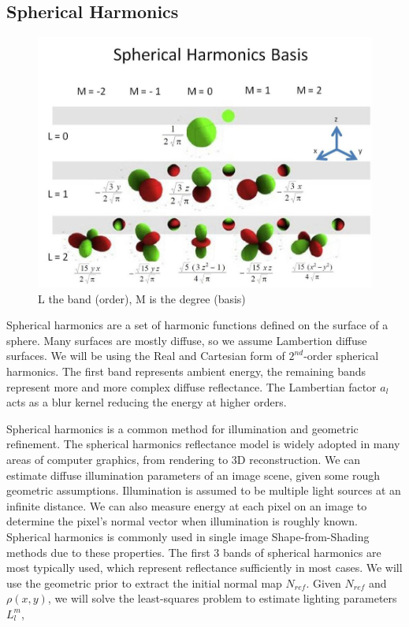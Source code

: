 \documentclass[10pt,twocolumn,letterpaper]{article}
\begin{document}
\subsection{Spherical Harmonics}
\begin{figure}[h]
    \begin{center}
        \includegraphics [scale=0.5] {image/sh_basis.jpg}
    \end{center}
    \caption{L the band (order), M is the degree (basis)}
    \label{fig:sh-basis}
\end{figure} 
Spherical harmonics are a set of harmonic functions defined on the surface of a sphere. Many surfaces are mostly diffuse, so we assume Lambertion diffuse surfaces. We will be using the Real and Cartesian form of $2^{nd}$-order spherical harmonics. The first band represents ambient energy, the remaining bands represent more and more complex diffuse reflectance. The Lambertian factor $a_l$ acts as a blur kernel reducing the energy at higher orders. \par
Spherical harmonics is a common method for illumination and geometric refinement. The spherical harmonics reflectance model is widely adopted in many areas of computer graphics, from rendering to 3D reconstruction. We can estimate diffuse illumination parameters of an image scene, given some rough geometric assumptions. Illumination is assumed to be multiple light sources at an infinite distance. We can also measure energy at each pixel on an image to determine the pixel's normal vector when illumination is roughly known. Spherical harmonics is commonly used in single image Shape-from-Shading methods due to these properties. The first 3 bands of spherical harmonics are most typically used, which represent reflectance sufficiently in most cases.
We will use the geometric prior to extract the initial normal map $N_{ref}$.  Given $N_{ref}$ and $\rho(x,y)$, we will solve the least-squares problem to estimate lighting parameters $L_l^m$,
\end{document}

